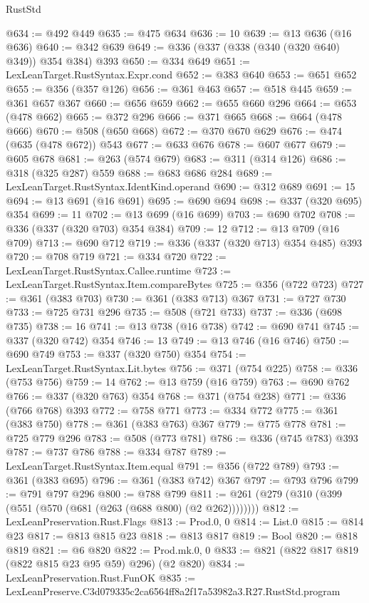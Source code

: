 \begin{lexlean}{RustStd}
\begin{coremodule}
@634 := @492 @449
@635 := @475 @634
@636 := 10
@639 := @13 @636 (@16 @636)
@640 := @342 @639
@649 := @336 (@337 (@338 (@340 (@320 @640) @349)) @354 @384) @393
@650 := @334 @649
@651 := LexLeanTarget.RustSyntax.Expr.cond
@652 := @383 @640
@653 := @651 @652
@655 := @356 (@357 @126)
@656 := @361 @463
@657 := @518 @445
@659 := @361 @657 @367
@660 := @656 @659
@662 := @655 @660 @296
@664 := @653 (@478 @662)
@665 := @372 @296
@666 := @371 @665
@668 := @664 (@478 @666)
@670 := @508 (@650 @668)
@672 := @370 @670 @629
@676 := @474 (@635 (@478 @672)) @543
@677 := @633 @676
@678 := @607 @677
@679 := @605 @678
@681 := @263 (@574 @679)
@683 := @311 (@314 @126)
@686 := @318 (@325 @287) @559
@688 := @683 @686 @284
@689 := LexLeanTarget.RustSyntax.IdentKind.operand
@690 := @312 @689
@691 := 15
@694 := @13 @691 (@16 @691)
@695 := @690 @694
@698 := @337 (@320 @695) @354
@699 := 11
@702 := @13 @699 (@16 @699)
@703 := @690 @702
@708 := @336 (@337 (@320 @703) @354 @384)
@709 := 12
@712 := @13 @709 (@16 @709)
@713 := @690 @712
@719 := @336 (@337 (@320 @713) @354 @485) @393
@720 := @708 @719
@721 := @334 @720
@722 := LexLeanTarget.RustSyntax.Callee.runtime
@723 := LexLeanTarget.RustSyntax.Item.compareBytes
@725 := @356 (@722 @723)
@727 := @361 (@383 @703)
@730 := @361 (@383 @713) @367
@731 := @727 @730
@733 := @725 @731 @296
@735 := @508 (@721 @733)
@737 := @336 (@698 @735)
@738 := 16
@741 := @13 @738 (@16 @738)
@742 := @690 @741
@745 := @337 (@320 @742) @354
@746 := 13
@749 := @13 @746 (@16 @746)
@750 := @690 @749
@753 := @337 (@320 @750) @354
@754 := LexLeanTarget.RustSyntax.Lit.bytes
@756 := @371 (@754 @225)
@758 := @336 (@753 @756)
@759 := 14
@762 := @13 @759 (@16 @759)
@763 := @690 @762
@766 := @337 (@320 @763) @354
@768 := @371 (@754 @238)
@771 := @336 (@766 @768) @393
@772 := @758 @771
@773 := @334 @772
@775 := @361 (@383 @750)
@778 := @361 (@383 @763) @367
@779 := @775 @778
@781 := @725 @779 @296
@783 := @508 (@773 @781)
@786 := @336 (@745 @783) @393
@787 := @737 @786
@788 := @334 @787
@789 := LexLeanTarget.RustSyntax.Item.equal
@791 := @356 (@722 @789)
@793 := @361 (@383 @695)
@796 := @361 (@383 @742) @367
@797 := @793 @796
@799 := @791 @797 @296
@800 := @788 @799
@811 := @261 (@279 (@310 (@399 (@551 (@570 (@681 (@263 (@688 @800) (@2 @262))))))))
@812 := LexLeanPreservation.Rust.Flags
@813 := Prod.{0, 0}
@814 := List.{0}
@815 := @814 @23
@817 := @813 @815 @23
@818 := @813 @817
@819 := Bool
@820 := @818 @819
@821 := @6 @820
@822 := Prod.mk.{0, 0}
@833 := @821 (@822 @817 @819 (@822 @815 @23 @95 @59) @296) (@2 @820)
@834 := LexLeanPreservation.Rust.FunOK
@835 := LexLeanPreserve.C3d079335c2ca6564ff8a2f17a53982a3.R27.RustStd.program

\end{coremodule}
\end{lexlean}
